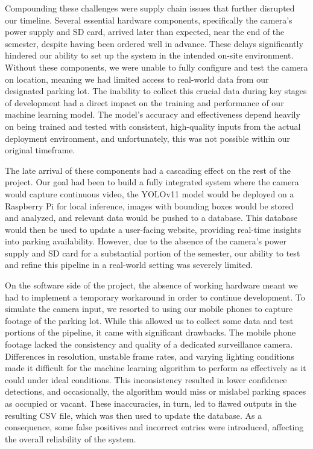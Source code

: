 \documentclass[conference]{IEEEtran}
\begin{document}
Compounding these challenges were supply chain issues that further disrupted our timeline. Several essential hardware components, specifically the camera’s power supply and SD card, arrived later than expected, near the end of the semester, despite having been ordered well in advance. These delays significantly hindered our ability to set up the system in the intended on-site environment. Without these components, we were unable to fully configure and test the camera on location, meaning we had limited access to real-world data from our designated parking lot. The inability to collect this crucial data during key stages of development had a direct impact on the training and performance of our machine learning model. The model's accuracy and effectiveness depend heavily on being trained and tested with consistent, high-quality inputs from the actual deployment environment, and unfortunately, this was not possible within our original timeframe.

The late arrival of these components had a cascading effect on the rest of the project. Our goal had been to build a fully integrated system where the camera would capture continuous video, the YOLOv11 model would be deployed on a Raspberry Pi for local inference, images with bounding boxes would be stored and analyzed, and relevant data would be pushed to a database. This database would then be used to update a user-facing website, providing real-time insights into parking availability. However, due to the absence of the camera’s power supply and SD card for a substantial portion of the semester, our ability to test and refine this pipeline in a real-world setting was severely limited.

On the software side of the project, the absence of working hardware meant we had to implement a temporary workaround in order to continue development. To simulate the camera input, we resorted to using our mobile phones to capture footage of the parking lot. While this allowed us to collect some data and test portions of the pipeline, it came with significant drawbacks. The mobile phone footage lacked the consistency and quality of a dedicated surveillance camera. Differences in resolution, unstable frame rates, and varying lighting conditions made it difficult for the machine learning algorithm to perform as effectively as it could under ideal conditions. This inconsistency resulted in lower confidence detections, and occasionally, the algorithm would miss or mislabel parking spaces as occupied or vacant. These inaccuracies, in turn, led to flawed outputs in the resulting CSV file, which was then used to update the database. As a consequence, some false positives and incorrect entries were introduced, affecting the overall reliability of the system.
\end{document}
